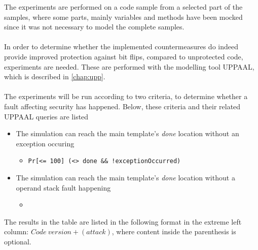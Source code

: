 The experiments are performed on a code sample from a selected part of the \jc samples, where some parts, mainly variables and methods have been mocked since it was not necessary to model the complete samples.\\\\
In order to determine whether the implemented countermeasures do indeed provide improved protection against bit flips, compared to unprotected code, experiments are needed. These are performed with the modelling tool UPPAAL, which is described in \cref{chap:upp}.\\\\
The experiments will be run according to two criteria, to determine whether a fault affecting security has happened. Below, these criteria and their related UPPAAL queries are listed

\begin{itemize}
\item The simulation can reach the main template's \textit{done} location without an exception occuring
	\begin{itemize}
	\item \texttt{Pr[<= 100] (<> done \&\& !exceptionOccurred)}
	\end{itemize}
\item The simulation can reach the main template's \textit{done} location without a operand stack fault happening
	\begin{itemize}
	\item
	\end{itemize}
\end{itemize}

The results in the table are listed in the following format in the extreme left column: $Code\:version + (attack)$, where content inside the parenthesis is optional.



